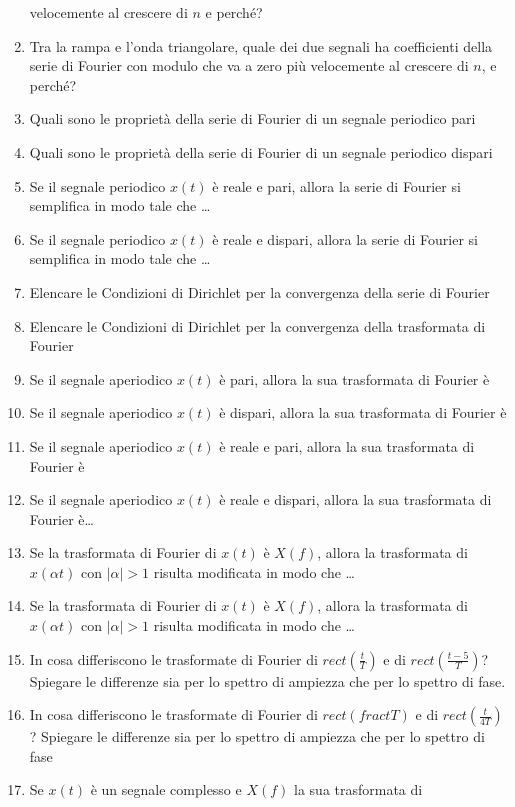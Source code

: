\documentclass[
  paper=a4,
  ,captions=tableheading
]{scrartcl}
\begin{document}
\begin{enumerate}
  velocemente al crescere di \(n\) e perché?
\item
  Tra la rampa e l'onda triangolare, quale dei due segnali ha
  coefficienti della serie di Fourier con modulo che va a zero più
  velocemente al crescere di \(n\), e perché?
\item
  Quali sono le proprietà della serie di Fourier di un segnale periodico
  pari
\item
  Quali sono le proprietà della serie di Fourier di un segnale periodico
  dispari
\item
  Se il segnale periodico \(x(t)\) è reale e pari, allora la serie di
  Fourier si semplifica in modo tale che \ldots{}
\item
  Se il segnale periodico \(x(t)\) è reale e dispari, allora la serie di
  Fourier si semplifica in modo tale che \ldots{}
\item
  Elencare le Condizioni di Dirichlet per la convergenza della serie di
  Fourier
\item
  Elencare le Condizioni di Dirichlet per la convergenza della
  trasformata di Fourier
\item
  Se il segnale aperiodico \(x(t)\) è pari, allora la sua trasformata di
  Fourier è
\item
  Se il segnale aperiodico \(x(t)\) è dispari, allora la sua trasformata
  di Fourier è
\item
  Se il segnale aperiodico \(x(t)\) è reale e pari, allora la sua
  trasformata di Fourier è
\item
  Se il segnale aperiodico \(x(t)\) è reale e dispari, allora la sua
  trasformata di Fourier è\ldots{}
\item
  Se la trasformata di Fourier di \(x(t)\) è \(X(f)\), allora la
  trasformata di \(x(\alpha t)\) con \(|\alpha|>1\) risulta modificata
  in modo che \ldots{}
\item
  Se la trasformata di Fourier di \(x(t)\) è \(X(f)\), allora la
  trasformata di \(x(\alpha t)\) con \(|\alpha|>1\) risulta modificata
  in modo che \ldots{}
\item
  In cosa differiscono le trasformate di Fourier di
  \(rect (\frac{t}{T})\) e di \(rect (\frac{t-5}{T})\)? Spiegare le
  differenze sia per lo spettro di ampiezza che per lo spettro di fase.
\item
  In cosa differiscono le trasformate di Fourier di \(rect(frac{t}{T})\)
  e di \(rect(\frac{t}{4T})\)? Spiegare le differenze sia per lo spettro
  di ampiezza che per lo spettro di fase
\item
  Se \(x(t)\) è un segnale complesso e \(X(f)\) la sua trasformata di

\end{enumerate}
\end{document}
